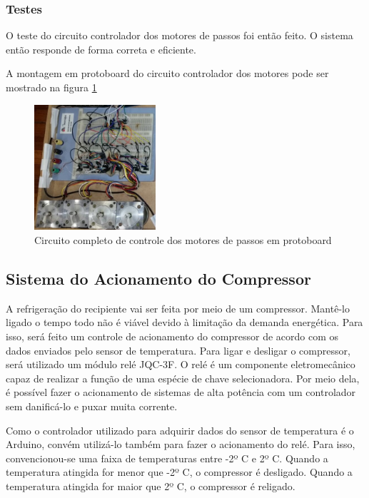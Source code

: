 \subsubsection{Testes}

O teste do circuito controlador dos motores de passos foi então feito. O sistema então responde de forma correta e eficiente.

A montagem em protoboard do circuito controlador dos motores pode ser mostrado na figura \ref{fig:circuito_motor_montado}

\begin{figure}[H]
\centering
\includegraphics[width=0.4\textwidth]{figuras/circuito_motor_montado}
 \caption{Circuito completo de controle dos motores de passos em protoboard}
\label{fig:circuito_motor_montado}
\end{figure}

\subsection{Sistema do Acionamento do Compressor}

A refrigeração do recipiente vai ser feita por meio de um compressor. Mantê-lo ligado o tempo todo não é viável devido à limitação da demanda energética. Para isso, será feito um controle de acionamento do compressor de acordo com os dados enviados pelo sensor de temperatura. Para ligar e desligar o compressor, será utilizado um módulo relé JQC-3F. O relé é um componente eletromecânico capaz de realizar a função de uma espécie de chave selecionadora. Por meio dela, é possível fazer o acionamento de sistemas de alta potência com um controlador sem danificá-lo e puxar muita corrente.

Como o controlador utilizado para adquirir dados do sensor de temperatura é o Arduino, convém utilizá-lo também para fazer o acionamento do relé. Para isso, convencionou-se uma faixa de temperaturas entre -2º C e 2º C. Quando a temperatura atingida for menor que -2º C, o compressor é desligado. Quando a temperatura atingida for maior que 2º C, o compressor é religado.

